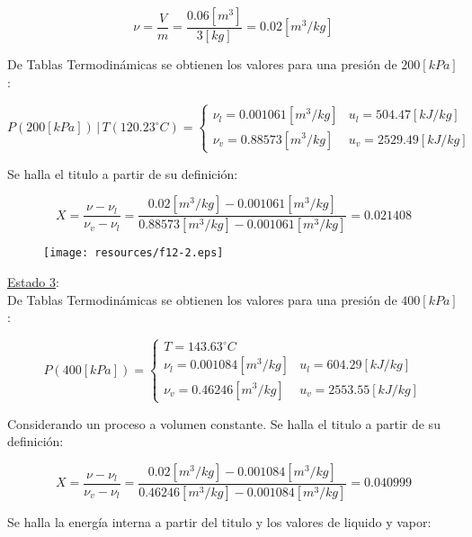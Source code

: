 \documentclass[letter,11pt]{article}
\begin{document}
\begin{enumerate}
\begin{equation*}
    \nu = \frac{V}{m} = \frac{0.06[m^3]}{3[kg]} = 0.02[m^3/kg]
\end{equation*}

De Tablas Termodinámicas se obtienen los valores para una presión de $200[kPa]$:

\begin{equation*}
    P(200[kPa])\,|\,T(120.23^\circ C) = \begin{cases}
        \nu_l = 0.001061[m^3/kg] & u_l = 504.47[kJ/kg] \\
        \nu_v = 0.88573[m^3/kg]  & u_v = 2529.49[kJ/kg]
    \end{cases}
\end{equation*}

Se halla el titulo a partir de su definición:

\begin{equation*}
    X = \frac{\nu-\nu_l}{\nu_v-\nu_l}
      = \frac{0.02[m^3/kg] - 0.001061[m^3/kg]}
      {0.88573[m^3/kg] - 0.001061[m^3/kg]}
      = 0.021408
\end{equation*}

\begin{figure}[H]
\centering
\texttt{[image: resources/f12-2.eps]}
\end{figure}

\underline{Estado 3}: \\
De Tablas Termodinámicas se obtienen los valores para una presión de
$400[kPa]$:

\begin{equation*}
    P(400[kPa]) = \begin{cases}
        T = 143.63^\circ C \\
        \nu_l = 0.001084[m^3/kg] & u_l = 604.29[kJ/kg] \\
        \nu_v = 0.46246[m^3/kg]  & u_v = 2553.55[kJ/kg]
    \end{cases}
\end{equation*}

Considerando un proceso a volumen constante. Se halla el titulo a partir de su
definición:

\begin{equation*}
    X = \frac{\nu-\nu_l}{\nu_v-\nu_l}
      = \frac{0.02[m^3/kg] - 0.001084[m^3/kg]}
      {0.46246[m^3/kg] - 0.001084[m^3/kg]}
      = 0.040999
\end{equation*}

Se halla la energía interna a partir del titulo y los valores de liquido y
vapor:


\end{enumerate}
\end{document}
